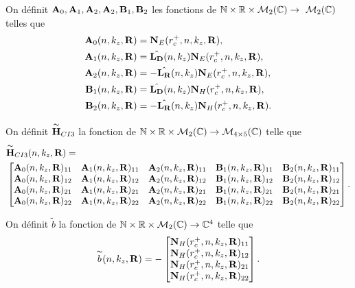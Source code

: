     \begin{defn}
      On définit \(\mathbf{A}_0,\mathbf{A}_1,\mathbf{A}_2,\mathbf{A}_2,\mathbf{B}_1,\mathbf{B}_2\) les fonctions de \(\mathbb N \times \mathbb R \times \mathcal{M}_2(\mathbb C) \rightarrow \ \mathcal{M}_2(\mathbb C)\) telles que        
      \begin{align*}
        \mathbf{A}_0(n,k_z,\mathbf{R}) &= \mathbf{N}_E(r_c^+,n,k_z,\mathbf{R}),
        \\
        \mathbf{A}_1(n,k_z,\mathbf{R}) &= \hat{\mathbf{L_D}}(n,k_z)\mathbf{N}_E(r_c^+,n,k_z,\mathbf{R}),
        \\
        \mathbf{A}_2(n,k_z,\mathbf{R}) &= -\hat{\mathbf{L_R}}(n,k_z)\mathbf{N}_E(r_c^+,n,k_z,\mathbf{R}),
        \\
        \mathbf{B}_1(n,k_z,\mathbf{R}) &= \hat{\mathbf{L_D}}(n,k_z)\mathbf{N}_H(r_c^+,n,k_z,\mathbf{R}),
        \\
        \mathbf{B}_2(n,k_z,\mathbf{R}) &= -\hat{\mathbf{L_R}}(n,k_z)\mathbf{N}_H(r_c^+,n,k_z,\mathbf{R})  .          
      \end{align*}

      On définit \(\overset{\thicksim}{\mathbf{H}}_{CI3}\) la fonction de \(\mathbb N \times \mathbb R \times \mathcal{M}_2(\mathbb C) \rightarrow \mathcal{M}_{4\times5}(\mathbb C)\) telle que
      \begin{align*}
        & \overset{\thicksim}{\mathbf{H}}_{CI3}(n,k_z,\mathbf{R}) =  \\ &
        \begin{bmatrix}
          \mathbf{A}_0(n,k_z,\mathbf{R})_{11} & \mathbf{A}_1(n,k_z,\mathbf{R})_{11} & \mathbf{A}_2(n,k_z,\mathbf{R})_{11} & \mathbf{B}_1(n,k_z,\mathbf{R})_{11} & \mathbf{B}_2(n,k_z,\mathbf{R})_{11}
          \\
          \mathbf{A}_0(n,k_z,\mathbf{R})_{12} & \mathbf{A}_1(n,k_z,\mathbf{R})_{12} & \mathbf{A}_2(n,k_z,\mathbf{R})_{12} & \mathbf{B}_1(n,k_z,\mathbf{R})_{12} & \mathbf{B}_2(n,k_z,\mathbf{R})_{12}
          \\
          \mathbf{A}_0(n,k_z,\mathbf{R})_{21} & \mathbf{A}_1(n,k_z,\mathbf{R})_{21} & \mathbf{A}_2(n,k_z,\mathbf{R})_{21} & \mathbf{B}_1(n,k_z,\mathbf{R})_{21} & \mathbf{B}_2(n,k_z,\mathbf{R})_{21}
          \\
          \mathbf{A}_0(n,k_z,\mathbf{R})_{22} & \mathbf{A}_1(n,k_z,\mathbf{R})_{22} & \mathbf{A}_2(n,k_z,\mathbf{R})_{22} & \mathbf{B}_1(n,k_z,\mathbf{R})_{22} & \mathbf{B}_2(n,k_z,\mathbf{R})_{22}
        \end{bmatrix}.
      \end{align*}

      On définit \(\tilde{b}\) la fonction de \(\mathbb N \times \mathbb R \times \mathcal{M}_2(\mathbb C) \rightarrow \mathbb C^4\) telle que
      \begin{equation*}
        \overset{\thicksim}{b}(n,k_z,\mathbf{R}) = -
        \begin{bmatrix}
          \mathbf{N}_H(r_c^+,n,k_z,\mathbf{R})_{11}
          \\
          \mathbf{N}_H(r_c^+,n,k_z,\mathbf{R})_{12}
          \\
          \mathbf{N}_H(r_c^+,n,k_z,\mathbf{R})_{21}
          \\
          \mathbf{N}_H(r_c^+,n,k_z,\mathbf{R})_{22}
        \end{bmatrix}.
      \end{equation*}
    \end{defn}

